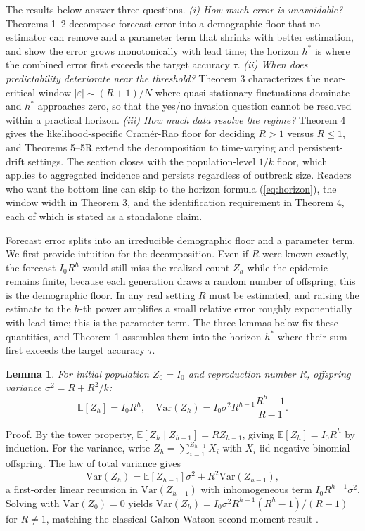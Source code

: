 \documentclass[review]{elsarticle}
\theoremstyle{plain}
\newtheorem{lemma}{Lemma}
\theoremstyle{definition}
\begin{document}
The results below answer three questions. \emph{(i) How much error is unavoidable?} Theorems 1--2 decompose forecast error into a demographic floor that no estimator can remove and a parameter term that shrinks with better estimation, and show the error grows monotonically with lead time; the horizon $h^*$ is where the combined error first exceeds the target accuracy $\tau$. \emph{(ii) When does predictability deteriorate near the threshold?} Theorem 3 characterizes the near-critical window $|\varepsilon| \sim (R+1)/N$ where quasi-stationary fluctuations dominate and $h^*$ approaches zero, so that the yes/no invasion question cannot be resolved within a practical horizon. \emph{(iii) How much data resolve the regime?} Theorem 4 gives the likelihood-specific Cramér-Rao floor for deciding $R>1$ versus $R\leq 1$, and Theorems 5--5R extend the decomposition to time-varying and persistent-drift settings. The section closes with the population-level $1/k$ floor, which applies to aggregated incidence and persists regardless of outbreak size. Readers who want the bottom line can skip to the horizon formula (\ref{eq:horizon}), the window width in Theorem 3, and the identification requirement in Theorem 4, each of which is stated as a standalone claim.

Forecast error splits into an irreducible demographic floor and a parameter term. We first provide intuition for the decomposition. Even if $R$ were known exactly, the forecast $I_0 R^h$ would still miss the realized count $Z_h$ while the epidemic remains finite, because each generation draws a random number of offspring; this is the demographic floor. In any real setting $R$ must be estimated, and raising the estimate to the $h$-th power amplifies a small relative error roughly exponentially with lead time; this is the parameter term. The three lemmas below fix these quantities, and Theorem 1 assembles them into the horizon $h^*$ where their sum first exceeds the target accuracy $\tau$.

\begin{lemma}
For initial population $Z_0 = I_0$ and reproduction number $R$, offspring variance $\sigma^2 = R + R^2/k$:
\begin{equation}
\mathbb{E}[Z_h] = I_0 R^h, \quad \text{Var}(Z_h) = I_0 \sigma^2 R^{h-1} \frac{R^h - 1}{R - 1}.
\end{equation}
\end{lemma}
Proof. By the tower property, $\mathbb{E}[Z_h \mid Z_{h-1}] = R Z_{h-1}$, giving $\mathbb{E}[Z_h] = I_0 R^h$ by induction. For the variance, write $Z_h = \sum_{i=1}^{Z_{h-1}} X_i$ with $X_i$ iid negative-binomial offspring. The law of total variance gives
\begin{equation}
\text{Var}(Z_h) = \mathbb{E}[Z_{h-1}]\sigma^2 + R^2 \text{Var}(Z_{h-1}),
\end{equation}
a first-order linear recursion in $\text{Var}(Z_{h-1})$ with inhomogeneous term $I_0 R^{h-1}\sigma^2$. Solving with $\text{Var}(Z_0)=0$ yields $\text{Var}(Z_h) = I_0\sigma^2 R^{h-1}(R^h-1)/(R-1)$ for $R\neq 1$, matching the classical Galton-Watson second-moment result \citep{harris1963branching}.
\end{document}
